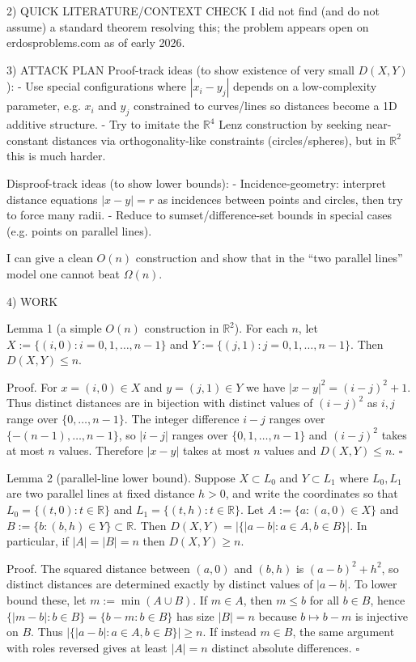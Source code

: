2) QUICK LITERATURE/CONTEXT CHECK
I did not find (and do not assume) a standard theorem resolving this; the problem appears open on erdosproblems.com as of early 2026.

3) ATTACK PLAN
Proof-track ideas (to show existence of very small $D(X,Y)$):
- Use special configurations where $|x_i-y_j|$ depends on a low-complexity parameter, e.g. $x_i$ and $y_j$ constrained to curves/lines so distances become a 1D additive structure.
- Try to imitate the $\mathbb{R}^4$ Lenz construction by seeking near-constant distances via orthogonality-like constraints (circles/spheres), but in $\mathbb{R}^2$ this is much harder.

Disproof-track ideas (to show lower bounds):
- Incidence-geometry: interpret distance equations $|x-y|=r$ as incidences between points and circles, then try to force many radii.
- Reduce to sumset/difference-set bounds in special cases (e.g. points on parallel lines).

I can give a clean $O(n)$ construction and show that in the ``two parallel lines'' model one cannot beat $\Omega(n)$.

4) WORK

Lemma 1 (a simple $O(n)$ construction in $\mathbb{R}^2$).
For each $n$, let
$X:=\{(i,0): i=0,1,\ldots,n-1\}$ and $Y:=\{(j,1): j=0,1,\ldots,n-1\}$.
Then $D(X,Y)\le n$.

Proof.
For $x=(i,0)\in X$ and $y=(j,1)\in Y$ we have $|x-y|^2=(i-j)^2+1$.
Thus distinct distances are in bijection with distinct values of $(i-j)^2$ as $i,j$ range over $\{0,\ldots,n-1\}$.
The integer difference $i-j$ ranges over $\{-(n-1),\ldots,n-1\}$, so $|i-j|$ ranges over $\{0,1,\ldots,n-1\}$ and $(i-j)^2$ takes at most $n$ values.
Therefore $|x-y|$ takes at most $n$ values and $D(X,Y)\le n$. $\square$

Lemma 2 (parallel-line lower bound).
Suppose $X\subset L_0$ and $Y\subset L_1$ where $L_0,L_1$ are two parallel lines at fixed distance $h>0$, and write the coordinates so that
$L_0=\{(t,0):t\in\mathbb{R}\}$ and $L_1=\{(t,h):t\in\mathbb{R}\}$.
Let $A:=\{a: (a,0)\in X\}$ and $B:=\{b: (b,h)\in Y\}\subset\mathbb{R}$. Then
$D(X,Y)=|\{|a-b|:a\in A,b\in B\}|$. In particular, if $|A|=|B|=n$ then $D(X,Y)\ge n$.

Proof.
The squared distance between $(a,0)$ and $(b,h)$ is $(a-b)^2+h^2$, so distinct distances are determined exactly by distinct values of $|a-b|$.
To lower bound these, let $m:=\min(A\cup B)$.
If $m\in A$, then $m\le b$ for all $b\in B$, hence $\{|m-b|:b\in B\}=\{b-m:b\in B\}$ has size $|B|=n$ because $b\mapsto b-m$ is injective on $B$.
Thus $|\{|a-b|:a\in A,b\in B\}|\ge n$.
If instead $m\in B$, the same argument with roles reversed gives at least $|A|=n$ distinct absolute differences. $\square$

